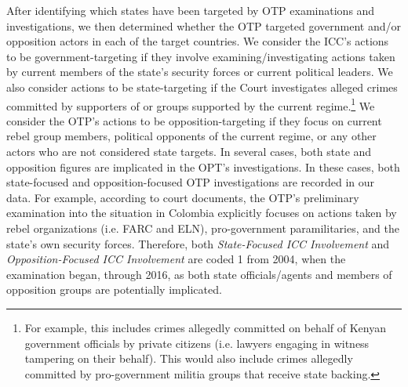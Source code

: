 After identifying which states have been targeted by OTP examinations and investigations, we then determined whether the OTP targeted government and/or opposition actors in each of the target countries. We consider the ICC's actions to be government-targeting if they involve examining/investigating actions taken by current members of the state's security forces or current political leaders. We also consider actions to be state-targeting if the Court investigates alleged crimes committed by supporters of or groups supported by the current regime.\footnote{For example, this includes crimes allegedly committed on behalf of Kenyan government officials by private citizens (i.e. lawyers engaging in witness tampering on their behalf). This would also include crimes allegedly committed by pro-government militia groups that receive state backing.} We consider the OTP's actions to be opposition-targeting if they focus on current rebel group members, political opponents of the current regime, or any other actors who are not considered state targets. In several cases, both state and opposition figures are implicated in the OPT's investigations. In these cases, both state-focused and opposition-focused OTP investigations are recorded in our data. For example, according to court documents, the OTP's preliminary examination into the situation in Colombia explicitly focuses on actions taken by rebel organizations (i.e. FARC and ELN), pro-government paramilitaries, and the state's own security forces. Therefore, both \emph{State-Focused ICC Involvement} and \emph{Opposition-Focused ICC Involvement} are coded 1 from 2004, when the examination began, through 2016, as both state officials/agents and members of opposition groups are potentially implicated.


